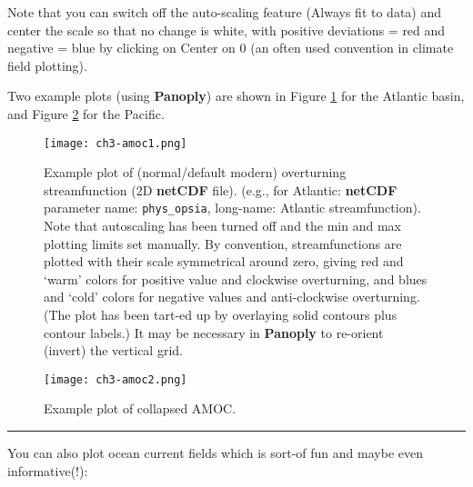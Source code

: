 \documentclass[11pt,fleqn]{book} %
\begin{document}
Note that you can switch off the auto-scaling feature (Always fit to data) and center the scale so that no change is white, with positive deviations = red and negative = blue by clicking on Center on 0 (an often used convention in climate field plotting).

Two example plots (using \textbf{Panoply}) are shown in Figure \ref{fig:ch3-amoc1} for the Atlantic basin, and Figure \ref{fig:ch3-amoc2} for the Pacific.

\begin{figure}
\texttt{[image: ch3-amoc1.png]}\centering
\vspace{-0mm}
\caption{Example plot of (normal/default modern) overturning streamfunction (2D \textbf{netCDF} file). (e.g., for Atlantic: \textbf{netCDF} parameter name: \texttt{phys\_opsia}, long-name: Atlantic streamfunction). Note that autoscaling has been turned off and the min and max plotting limits set manually. By convention, streamfunctions are plotted with their scale symmetrical around zero, giving red and ‘warm’ colors for positive value and clockwise overturning, and blues and ‘cold’ colors for negative values and anti-clockwise overturning. (The plot has been tart-ed up by overlaying solid contours plus contour labels.) It may be necessary in \textbf{Panoply} to re-orient (invert) the vertical grid.}
\label{fig:ch3-amoc1}
\end{figure}

\begin{figure}
\texttt{[image: ch3-amoc2.png]}\centering
\vspace{-0mm}
\caption{Example plot of collapsed AMOC.}
\label{fig:ch3-amoc2}
\end{figure}

\hfill \break
\noindent\rule{4cm}{0.1mm}
\hfill \break

\noindent You can also plot ocean current fields which is sort-of fun and maybe even informative(!):
\end{document}
